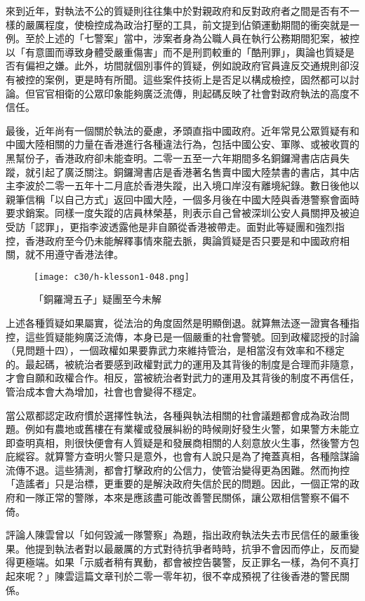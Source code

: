 來到近年，對執法不公的質疑則往往集中於對親政府和反對政府者之間是否有不一樣的嚴厲程度，使檢控成為政治打壓的工具，前文提到佔領運動期間的衝突就是一例。至於上述的「七警案」當中，涉案者身為公職人員在執行公務期間犯案，被控以「有意圖而導致身體受嚴重傷害」而不是刑罰較重的「酷刑罪」，輿論也質疑是否有偏袒之嫌。此外，坊間就個別事件的質疑，例如說政府官員違反交通規則卻沒有被控的案例，更是時有所聞。這些案件技術上是否足以構成檢控，固然都可以討論。但官官相衛的公眾印象能夠廣泛流傳，則起碼反映了社會對政府執法的高度不信任。

最後，近年尚有一個關於執法的憂慮，矛頭直指中國政府。近年常見公眾質疑有和中國大陸相關的力量在香港進行各種違法行為，包括中國公安、軍隊、或被收買的黑幫份子，香港政府卻未能查明。二零一五至一六年期間多名銅鑼灣書店店員失蹤，就引起了廣泛關注。銅鑼灣書店是香港著名售賣中國大陸禁書的書店，其中店主李波於二零一五年十二月底於香港失蹤，出入境口岸沒有離境紀錄。數日後他以親筆信稱「以自己方式」返回中國大陸，一個多月後在中國大陸與香港警察會面時要求銷案。同樣一度失蹤的店員林榮基，則表示自己曾被深圳公安人員關押及被迫受訪「認罪」，更指李波透露他是非自願從香港被帶走。面對此等疑團和強烈指控，香港政府至今仍未能解釋事情來龍去脈，輿論質疑是否只要是和中國政府相關，就不用遵守香港法律。

\begin{figure}[htbp]
    \centering
    \texttt{[image: c30/h-klesson1-048.png]}
    \caption{「銅羅灣五子」疑團至今未解} 
\end{figure}

上述各種質疑如果屬實，從法治的角度固然是明顯倒退。就算無法逐一證實各種指控，這些質疑能夠廣泛流傳，本身已是一個嚴重的社會警號。回到政權認授的討論（見問題十四），一個政權如果要靠武力來維持管治，是相當沒有效率和不穩定的。最起碼，被統治者要感到政權對武力的運用及其背後的制度是合理而非隨意，才會自願和政權合作。相反，當被統治者對武力的運用及其背後的制度不再信任，管治成本會大為增加，社會也會變得不穩定。

當公眾都認定政府慣於選擇性執法，各種與執法相關的社會議題都會成為政治問題。例如有農地或舊樓在有業權或發展糾紛的時候剛好發生火警，如果警方未能立即查明真相，則很快便會有人質疑是和發展商相關的人刻意放火生事，然後警方包庇縱容。就算警方查明火警只是意外，也會有人說只是為了掩蓋真相，各種陰謀論流傳不退。這些猜測，都會打擊政府的公信力，使管治變得更為困難。然而拘控「造謠者」只是治標，更重要的是解決政府失信於民的問題。因此，一個正常的政府和一隊正常的警隊，本來是應該盡可能改善警民關係，讓公眾相信警察不偏不倚。

評論人陳雲曾以「如何毀滅一隊警察」為題，指出政府執法失去市民信任的嚴重後果。他提到執法者對以最嚴厲的方式對待抗爭者時時，抗爭不會因而停止，反而變得更極端。如果「示威者稍有異動，都會被控告襲警，反正罪名一樣，為何不真打起來呢？」陳雲這篇文章刊於二零一零年初，很不幸成預視了往後香港的警民關係。

